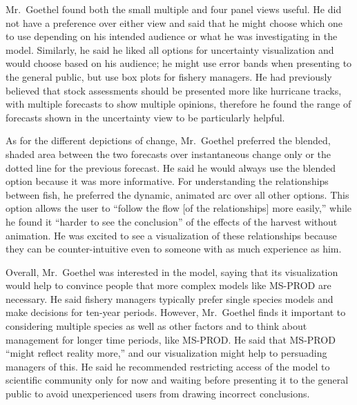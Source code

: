 Mr.\ Goethel found both the small multiple and four panel views useful.  He did not have a preference over either view and said that he might choose which one to use depending on his intended audience or what he was investigating in the model.  Similarly, he said he liked all options for uncertainty visualization and would choose based on his audience; he might use error bands when presenting to the general public, but use box plots for fishery managers.  He had previously believed that stock assessments should be presented more like hurricane tracks, with multiple forecasts to show multiple opinions, therefore he found the range of forecasts shown in the uncertainty view to be particularly helpful.

As for the different depictions of change, Mr.\ Goethel preferred the blended, shaded area between the two forecasts over instantaneous change only or the dotted line for the previous forecast.  He said he would always use the blended option because it was more informative.  For understanding the relationships between fish, he preferred the dynamic, animated arc over all other options.  This option allows the user to ``follow the flow [of the relationships] more easily,'' while he found it ``harder to see the conclusion'' of the effects of the harvest without animation.  He was excited to see a visualization of these relationships because they can be counter-intuitive even to someone with as much experience as him.

Overall, Mr.\ Goethel was interested in the model, saying that its visualization would help to convince people that more complex models like MS-PROD are necessary.  He said fishery managers typically prefer single species models and make decisions for ten-year periods.  However, Mr.\ Goethel finds it important to considering multiple species as well as other factors and to think about management for longer time periods, like MS-PROD.  He said that MS-PROD ``might reflect reality more,'' and our visualization might help to persuading managers of this.  He said he recommended restricting access of the model to scientific community only for now and waiting before presenting it to the general public to avoid unexperienced users from drawing incorrect conclusions.
